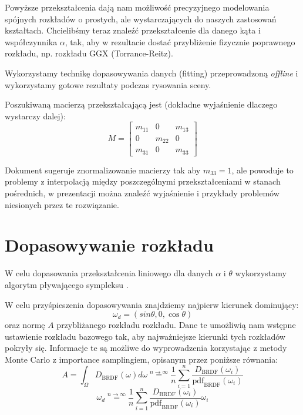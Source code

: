 \documentclass[../main.tex]{subfiles}
\begin{document}
Powyższe przekształcenia dają nam możliwość precyzyjnego modelowania
spójnych rozkładów o prostych, ale wystarczających do naszych zastosowań
kształtach. Chcielibśmy teraz znaleźć przekształcenie dla danego kąta
i współczynnika $\alpha$, tak, aby w rezultacie dostać przybliżenie
fizycznie poprawnego rozkładu, np. rozkładu GGX (Torrance-Reitz).

Wykorzystamy technikę dopasowywania danych (fitting) przeprowadzoną
\textit{offline} i wykorzystamy gotowe rezultaty podczas rysowania sceny.

Poszukiwaną macierzą przekształcającą jest (dokładne wyjaśnienie dlaczego
wystarczy dalej):
\[
M =
\begin{bmatrix}
  m_{11} & 0 & m_{13} \\
  0 & m_{22} & 0 \\
  m_{31} & 0 & m_{33}
\end{bmatrix}
\]

Dokument \cite{ltc_heitz} sugeruje znormalizowanie macierzy tak aby $m_{33}=1$,
ale powoduje to problemy z interpolacją między poszczególnymi przekształceniami
w stanach pośrednich, w prezentacji \cite{LTCJourneyPresentation} można znaleźć
wyjaśnienie i przykłady problemów niesionych przez te rozwiązanie.

\section{Dopasowywanie rozkładu}

W celu dopasowania przekształcenia liniowego dla danych $\alpha$
i $\theta$ wykorzystamy algorytm pływającego sympleksu \cite{NelderMead65}.

W celu przyśpieszenia dopasowywania znajdziemy najpierw kierunek dominujący:
\[ \omega_d = \left(sin\theta, 0, \cos\theta\right) \]
\noindent oraz normę $A$ przybliżanego rozkładu rozkładu. Dane te umożliwią nam wstępne
ustawienie rozkładu bazowego tak, aby najważniejsze kierunki tych rozkładów
pokryły się. Informacje te są możliwe do wyprowadzenia korzystając z metody
Monte Carlo z importance samplingiem, opisanym przez poniższe równania:
\[
A = \int_{\Omega} D_{\text{BRDF}}(\omega)d\omega
\stackrel{n \rightarrow \infty}{=}
\frac{1}{n} \sum_{i=1}^{n} {
  \frac{
    D_{\text{BRDF}}(\omega_i)
  }{
    \text{pdf}_{\text{BRDF}}(\omega_i)
  }
}
\]
\[
\omega_d
\stackrel{n \rightarrow \infty}{=}
\frac{1}{n} \sum_{i=1}^{n} {
  \frac{
    D_{\text{BRDF}}(\omega_i)
  }{
    \text{pdf}_{\text{BRDF}}(\omega_i)
  }
  \omega_i
}
\]
\end{document}
